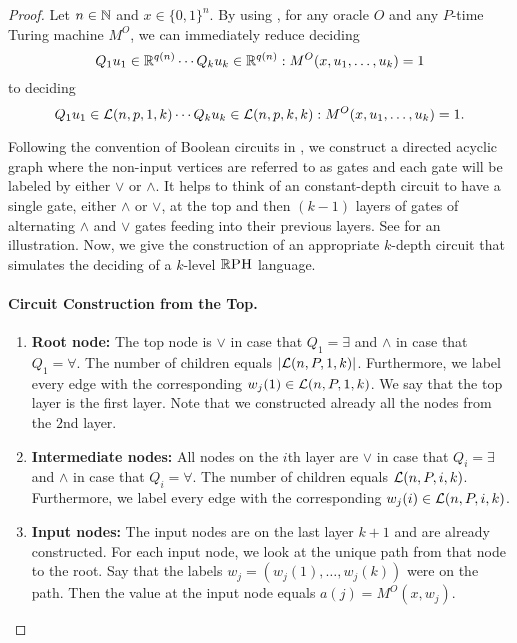 \documentclass{article}
\begin{document}
\bigskip

\begin{proof}
Let $n\in \mathbb{N}$ and $x \in \{0,1\}^n$. By using , for any oracle $O$ and any $P$-time Turing machine $M^O$, we can immediately reduce deciding
\begin{equation}
\label{eq:ActualMachine}
    Q_1 u_1 \in \mathbb{R}^{q(n)} \cdots Q_k u_k \in \mathbb{R}^{q(n)} : M^O(x, u_1,\ldots,u_k)=1
\end{equation}
to deciding
\begin{equation}
\label{eq:FunctionallyEquivalentMachine}
    Q_1 u_1 \in \mathcal{L}(n,p, 1, k) \cdots Q_k u_k \in \mathcal{L}(n, p, k, k) : M^O(x,u_1,\ldots,u_k)=1.
\end{equation}
    
\noindent Following the convention of Boolean circuits in , we construct a directed acyclic graph where the non-input vertices are referred to as gates and each gate will be labeled by either $\lor$ or $\land$. It helps to think of an constant-depth circuit to have a single gate, either $\land$ or $\lor$, at the top and then $(k-1)$ layers of gates of alternating $\land$ and $\lor$ gates feeding into their previous layers.
See  for an illustration.
Now, we give the construction of an appropriate $k$-depth circuit that simulates the deciding of a $k$-level $\mathbb{R}\textsc{PH}$ language.

\paragraph{Circuit Construction from the Top.}

\begin{enumerate}
    \item \textbf{Root node:} The top node is $\lor$ in case that $Q_1 = \exists$ and $\land$ in case that $Q_1 = \forall$.
    The number of children equals $|\mathcal{L}(n,P,1,k)|$.
    Furthermore, we label every edge with the corresponding $w_j(1) \in \mathcal{L}(n,P,1,k)$.
    We say that the top layer is the first layer.
    Note that we constructed already all the nodes from the $2$nd layer.
    \item \textbf{Intermediate nodes:} All nodes on the $i$th layer are  $\lor$ in case that $Q_i = \exists$ and $\land$ in case that $Q_i = \forall$.
    The number of children equals $\mathcal{L}(n,P,i,k)$.
    Furthermore, we label every edge with the corresponding $w_j(i) \in \mathcal{L}(n,P,i,k)$.
    \item \textbf{Input nodes:}
    The input nodes are on the last layer $k+1$ and are already constructed.
    For each input node, we look at the unique path from that node to the root. 
    Say that the labels $w_j = (w_{j}(1),\ldots,w_j(k))$ were on the path. 
    Then the value at the input node equals $a(j) = M^O(x,w_j)$.
\end{enumerate}


\end{proof}
\end{document}
